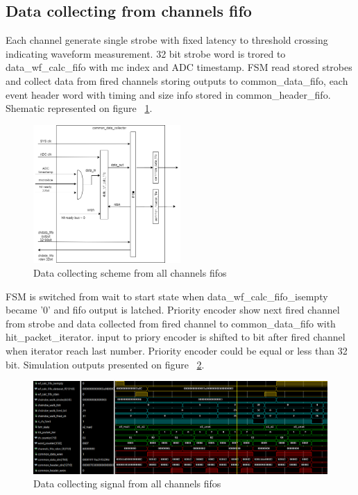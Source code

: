 \documentclass{article}
\begin{document}
\subsection{Data collecting from channels fifo}

Each channel generate single strobe with fixed latency to threshold crossing indicating waveform measurement. 32 bit strobe word is trored to data\_wf\_calc\_fifo with mc index and ADC timestamp. FSM read stored strobes and collect data from fired channels storing outputs to common\_data\_fifo, each event header word with timing and size info stored in common\_header\_fifo. Shematic represented on figure ~\ref{fig:3}.

\begin{figure}[H]
	\centering 
	\includegraphics[width=0.5\textwidth]{ADC_common_event_collection.png}
	\caption{\label{fig:3} Data collecting scheme from all channels fifos}
\end{figure}


FSM is switched from wait to start state when data\_wf\_calc\_fifo\_isempty became '0' and fifo output is latched. Priority encoder show next fired channel from strobe and data collected from fired channel to common\_data\_fifo with hit\_packet\_iterator. input to priory encoder is shifted to bit after fired channel when iterator reach last number. Priority encoder could be equal or less than 32 bit. Simulation outputs presented on figure ~\ref{fig:4}.

\begin{figure}[H]
	\centering 
	\includegraphics[width=1.0\textwidth]{ADC_common_data_collector_wave.png}
	\caption{\label{fig:4} Data collecting signal from all channels fifos}
\end{figure}
\end{document}
